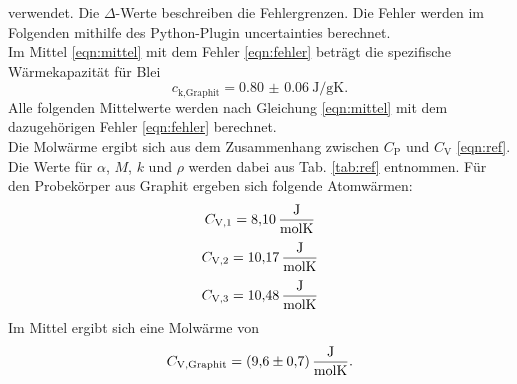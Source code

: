 verwendet. Die $\Delta$-Werte beschreiben die Fehlergrenzen.
Die Fehler werden im Folgenden mithilfe des Python-Plugin uncertainties \cite{uncertainties} berechnet.
\\
Im Mittel \eqref{eqn:mittel} mit dem Fehler \eqref{eqn:fehler} beträgt die spezifische Wärmekapazität für Blei
\begin{equation}
    c_\text{k,Graphit} = \SI{0.80(6)}{\joule/\gram\kelvin} .
\end{equation}
Alle folgenden Mittelwerte werden nach Gleichung \eqref{eqn:mittel} mit dem dazugehörigen Fehler \eqref{eqn:fehler} berechnet.
\\
Die Molwärme ergibt sich aus dem Zusammenhang zwischen $C_\text{P}$ und $C_\text{V}$ \eqref{eqn:ref}.
Die Werte für $\alpha$, $M$, $k$ und $\rho$ werden dabei aus Tab. \ref{tab:ref} entnommen.
Für den Probekörper aus Graphit ergeben sich folgende Atomwärmen:
\begin{equation*}
    C_\text{V,1} = \SI{8.10}{\frac{\joule}{\mol\kelvin}}
\end{equation*}
\begin{equation*}
    C_\text{V,2} = \SI{10.17}{\frac{\joule}{\mol\kelvin}}
\end{equation*}
\begin{equation*}
    C_\text{V,3} = \SI{10.48}{\frac{\joule}{\mol\kelvin}}
\end{equation*}
Im Mittel ergibt sich eine Molwärme von
\begin{equation}
    C_\text{V,Graphit} = \SI{9.6(7)}{\frac{\joule}{\mol\kelvin}} .
\end{equation}

